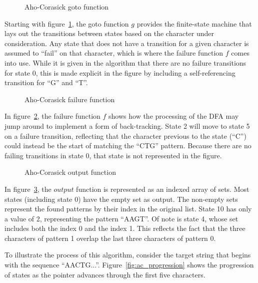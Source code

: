 \begin{figure}[ht]
\centering

\caption{Aho-Corasick goto function}
\label{fig:ac_goto_function}
\end{figure}

Starting with figure~\ref{fig:ac_goto_function}, the goto function $g$ provides the finite-state machine that lays out the transitions between states based on the character under consideration. Any state that does not have a transition for a given character is assumed to ``fail'' on that character, which is where the failure function $f$ comes into use. While it is given in the algorithm that there are no failure transitions for state 0, this is made explicit in the figure by including a self-referencing transition for ``G'' and ``T''.

\begin{figure}[ht]
\centering

\caption{Aho-Corasick failure function}
\label{fig:ac_failure_function}
\end{figure}

In figure~\ref{fig:ac_failure_function}, the failure function $f$ shows how the processing of the DFA may jump around to implement a form of back-tracking. State 2 will move to state 5 on a failure transition, reflecting that the character previous to the state (``C'') could instead be the start of matching the ``CTG'' pattern. Because there are no failing transitions in state 0, that state is not represented in the figure.

\begin{figure}[ht]
\centering

\caption{Aho-Corasick output function}
\label{fig:ac_output_function}
\end{figure}

In figure~\ref{fig:ac_output_function}, the $output$ function is represented as an indexed array of sets. Most states (including state 0) have the empty set as output. The non-empty sets represent the found patterns by their index in the original list. State 10 has only a value of 2, representing the pattern ``AAGT''. Of note is state 4, whose set includes both the index 0 and the index 1. This reflects the fact that the three characters of pattern 1 overlap the last three characters of pattern 0.

To illustrate the process of this algorithm, consider the target string that begins with the sequence ``AACTG...''. Figure~\ref{fig:ac_progression} shows the progression of states as the pointer advances through the first five characters.

